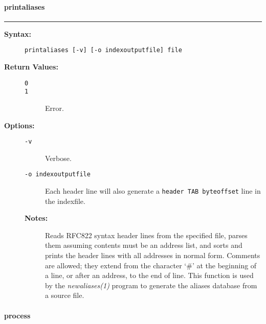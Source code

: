 \vspace {2pt}


\paragraph{printaliases}

\hrule
\begin{description}
\item[{\bf Syntax:}] \mbox{}

{\tt printaliases [-v] [-o indexoutputfile] file}

\item[{\bf Return Values:}] \mbox{}

\begin{description}
\item[{\tt 0}] \mbox{}



\item[{\tt 1}] \mbox{}

Error.

\end{description}


\item[{\bf Options:}] \mbox{}

\begin{description}
\item[{\tt -v}] \mbox{}

Verbose.

\item[{\tt -o indexoutputfile}] \mbox{}

Each header line will also generate 
a {\tt header TAB byteoffset} line in the indexfile.

\item[{\bf Notes:}] \mbox{}

Reads RFC822 syntax header lines from the specified
file, parses them assuming contents must be an address list, and sorts 
and prints the header lines with all addresses in normal form. Comments 
are allowed; they extend from the character `\#' at the beginning of 
a line, or after an address, to the end of line. This function is used 
by the {\em newaliases(1)\/} program to generate the aliases database 
from a source file.

\end{description}


\end{description}


\vspace {2pt}


\paragraph{process}

